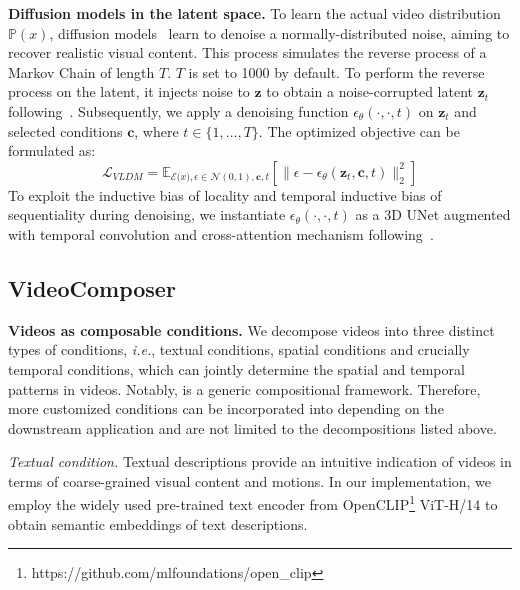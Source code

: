 \textbf{Diffusion models in the latent space.}
To learn the actual video distribution $\mathbb{P}(x)$, diffusion models~\cite{sohl2015Diffusion_model,ho2020denoising_ddpm} learn to denoise a normally-distributed noise, aiming to recover realistic visual content.
This process simulates the reverse process of a Markov Chain of length $T$.
$T$ is set to 1000 by default.
To perform the reverse process on the latent, it injects noise to $\bm{z}$ to obtain a noise-corrupted latent $\bm{z}_{t}$ following~\cite{rombach2022LDM}.
Subsequently, we apply a denoising function $\epsilon_{\theta}(\cdot, \cdot, t)$ on $\bm{z}_{t}$ and selected conditions $\bm{c}$, where $t \in \{1,...,T\}$.
The optimized objective can be formulated as:
\begin{equation}
    \mathcal{L}_{VLDM} = \mathbb{E}_{\mathcal{E}\bm(x), \epsilon \in \mathcal{N}(0,1), \bm{c}, t} \left[\| \epsilon - \epsilon_{\theta}(\bm{z}_{t}, \bm{c}, t) \|_{2}^{2}\right]
\end{equation}
To exploit the inductive bias of locality and temporal inductive bias of sequentiality during denoising, we instantiate $\epsilon_{\theta}(\cdot, \cdot, t)$ as a 3D UNet augmented with temporal convolution and cross-attention mechanism following~\cite{modelscope2023, ronneberger2015UNet, ho2022video_diffusion_models}.

\subsection{VideoComposer}

\textbf{Videos as composable conditions.} 
We decompose videos into three distinct types of conditions, \emph{i.e.}, textual conditions, spatial conditions and crucially temporal conditions, which can jointly determine the spatial and temporal patterns in videos.
Notably, \method is a generic compositional framework.
Therefore, more customized conditions can be incorporated into \method depending on the downstream application and are not limited to the decompositions listed above. 

\emph{Textual condition.}
Textual descriptions provide an intuitive indication of videos in terms of coarse-grained visual content and motions.
In our implementation, we employ the widely used pre-trained text encoder from OpenCLIP\footnote{https://github.com/mlfoundations/open\_clip} ViT-H/14  to obtain semantic embeddings of text descriptions.

